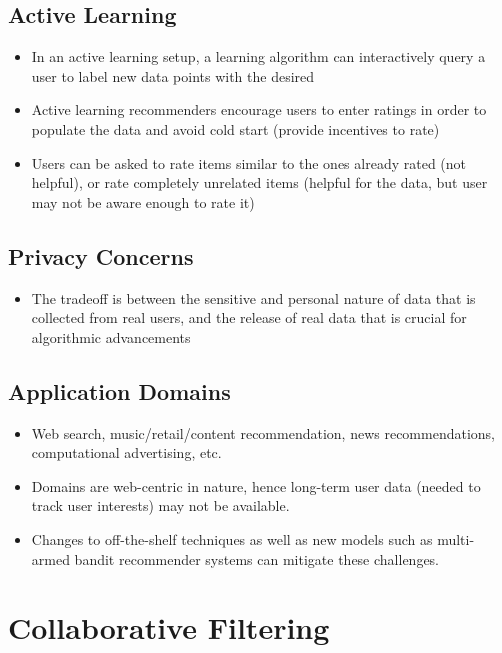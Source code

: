 \documentclass{article}
\begin{document}
\subsection{Active Learning}
\begin{itemize}
    \item In an active learning setup, a learning algorithm can interactively query a user to label new data points with the desired 
    
    \item Active learning recommenders encourage users to enter ratings in order to populate the data and avoid cold start (provide incentives to rate)
    
    \item Users can be asked to rate items similar to the ones already rated (not helpful), or rate completely unrelated items (helpful for the data, but user may not be aware enough to rate it)
\end{itemize}

\subsection{Privacy Concerns}
\begin{itemize}
    \item The tradeoff is between the sensitive and personal nature of data that is collected from real users, and the release of real data that is crucial for algorithmic advancements
\end{itemize}

\subsection{Application Domains}
\begin{itemize}
    \item Web search, music/retail/content recommendation, news recommendations, computational advertising, etc.
    
    \item Domains are web-centric in nature, hence long-term user data (needed to track user interests) may not be available. 
    
    \item Changes to off-the-shelf techniques as well as new models such as multi-armed bandit recommender systems can mitigate these challenges. 
\end{itemize}

\section{Collaborative Filtering}
\end{document}
